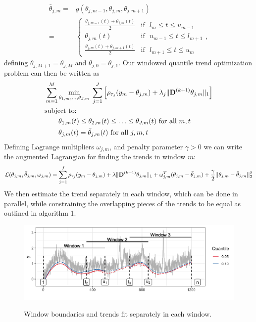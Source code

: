 \documentclass[12pt]{article}
\newcommand{\M}[1]{{\bm{\mathbf{\MakeUppercase{#1}}}}} %
\newcommand{\Mn}[2]{\M{#1}^{(#2)}} %
\begin{document}
	 \begin{align*}
		 \bar{\theta}_{j,m} =&  g(\theta_{j, m-1}, \theta_{j,m}, \theta_{j,m+1}) \\
		 =& \begin{cases} 
			 \frac{\theta_{j,m-1}(t)+\theta_{j,m}(t)}{2} & \mbox{if~~} l_{m} \le t \le u_{m-1}  \\
			 \theta_{j,m}(t) & \mbox{if~~} u_{m-1} \le t \le l_{m+1}  \\
			 \frac{\theta_{j,m}(t)+\theta_{j,m+1}(t)}{2} & \mbox{if~~} l_{m+1} \le t \le u_{m}  
			 \end{cases},
	\end{align*}
	defining $\theta_{j,M+1} = \theta_{j,M}$ and $\theta_{j,0} = \theta_{j,1}$. Our windowed quantile trend optimization problem can then be written as 
	 \begin{align*}
		 \label{eq:quantile_windows}
		 &\sum_{m=1}^M\underset{\theta_{1,m}, \ldots, \theta_{J,m}}{\min}\; \sum_{j=1}^J \left [\rho_{\tau_j}(y_m - \theta_{j,m}) + 
		 \lambda_j \lVert \Mn{D}{k+1} \theta_{j,m} \rVert_1 \right ] \\
		 &\text{subject to: }\; \\
		 &\qquad \theta_{1,m}(t) \le \theta_{2,m}(t) \le \ldots \le \theta_{J,m}(t) \text{ for all } m,t \\
		 &\qquad \theta_{j,m}(t) = \bar{\theta}_{j,m}(t) \text{ for all } j, m, t
	 \end{align*}
	 Defining Lagrange multipliers $\omega_{j,m}$, and penalty parameter $\gamma > 0$ we can write the augmented Lagrangian for finding the trends in window $m$:
	 \begin{equation*}
	 \mathcal{L}(\theta_{j,m}, \bar{\theta}_{j,m}, \omega_{j,m}) = \sum_{j=1}^J\rho_{\tau_j}(y_m - \theta_{j,m})+\lambda \lVert \Mn{D}{k+1}\theta_{j,m}\rVert_1 +  \omega_{j,m}^T(\theta_{j,m} - \bar{\theta}_{j,m}) + 
	 \frac{\gamma}{2}||\theta_{j,m} - \bar{\theta}_{j,m}||_2^2
	 \end{equation*}
	 We then estimate the trend separately in each window, which can be done in parallel, while constraining the overlapping pieces of the trends to be equal as outlined in algorithm 1. 
	 
	\begin{figure}[!h] 
		\centering
		\caption{Window boundaries and trends fit separately in each window.}
		\includegraphics[width = 0.8\linewidth]{Figures/overlapping_windows.png}
		\label{fig:windows}
	\end{figure}
\end{document}
